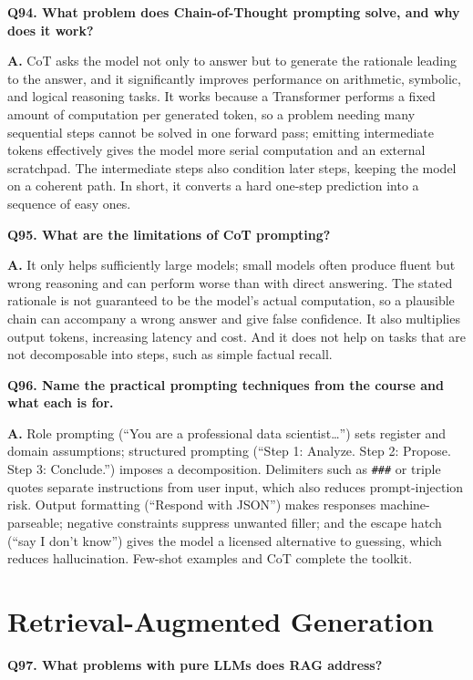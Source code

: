 \documentclass[11pt]{article}
\begin{document}
\medskip
\noindent\textbf{Q94. What problem does Chain-of-Thought prompting solve, and why does it work?}

\noindent\textbf{A.} CoT asks the model not only to answer but to generate the rationale leading to the answer, and it significantly improves performance on arithmetic, symbolic, and logical reasoning tasks. It works because a Transformer performs a fixed amount of computation per generated token, so a problem needing many sequential steps cannot be solved in one forward pass; emitting intermediate tokens effectively gives the model more serial computation and an external scratchpad. The intermediate steps also condition later steps, keeping the model on a coherent path. In short, it converts a hard one-step prediction into a sequence of easy ones.

\medskip
\noindent\textbf{Q95. What are the limitations of CoT prompting?}

\noindent\textbf{A.} It only helps sufficiently large models; small models often produce fluent but wrong reasoning and can perform worse than with direct answering. The stated rationale is not guaranteed to be the model's actual computation, so a plausible chain can accompany a wrong answer and give false confidence. It also multiplies output tokens, increasing latency and cost. And it does not help on tasks that are not decomposable into steps, such as simple factual recall.

\medskip
\noindent\textbf{Q96. Name the practical prompting techniques from the course and what each is for.}

\noindent\textbf{A.} Role prompting (``You are a professional data scientist\ldots'') sets register and domain assumptions; structured prompting (``Step 1: Analyze. Step 2: Propose. Step 3: Conclude.'') imposes a decomposition. Delimiters such as \texttt{\#\#\#} or triple quotes separate instructions from user input, which also reduces prompt-injection risk. Output formatting (``Respond with JSON'') makes responses machine-parseable; negative constraints suppress unwanted filler; and the escape hatch (``say I don't know'') gives the model a licensed alternative to guessing, which reduces hallucination. Few-shot examples and CoT complete the toolkit.

\section{Retrieval-Augmented Generation}

\noindent\textbf{Q97. What problems with pure LLMs does RAG address?}
\end{document}
